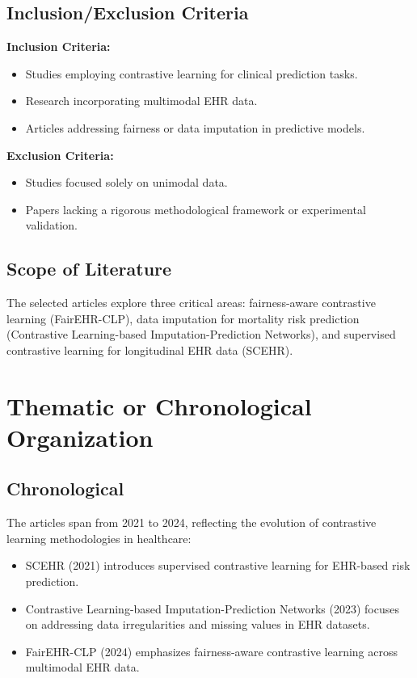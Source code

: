 \documentclass[a4paper]{article}
\begin{document}
    \subsection{Inclusion/Exclusion Criteria}
    \textbf{Inclusion Criteria:}
    \begin{itemize}
        \item Studies employing contrastive learning for clinical prediction tasks.

        \item Research incorporating multimodal EHR data.

        \item Articles addressing fairness or data imputation in predictive models.
    \end{itemize}
    \textbf{Exclusion Criteria:}
    \begin{itemize}
        \item Studies focused solely on unimodal data.

        \item Papers lacking a rigorous methodological framework or experimental
            validation.
    \end{itemize}

    \subsection{Scope of Literature}
    The selected articles explore three critical areas: fairness-aware
    contrastive learning (FairEHR-CLP), data imputation for mortality risk prediction
    (Contrastive Learning-based Imputation-Prediction Networks), and supervised
    contrastive learning for longitudinal EHR data (SCEHR).

    \section{Thematic or Chronological Organization}

    \subsection{Chronological}
    The articles span from 2021 to 2024, reflecting the evolution of contrastive
    learning methodologies in healthcare:
    \begin{itemize}
        \item SCEHR (2021) introduces supervised contrastive learning for EHR-based
            risk prediction.

        \item Contrastive Learning-based Imputation-Prediction Networks (2023) focuses
            on addressing data irregularities and missing values in EHR datasets.

        \item FairEHR-CLP (2024) emphasizes fairness-aware contrastive learning across
            multimodal EHR data.
    \end{itemize}
\end{document}
